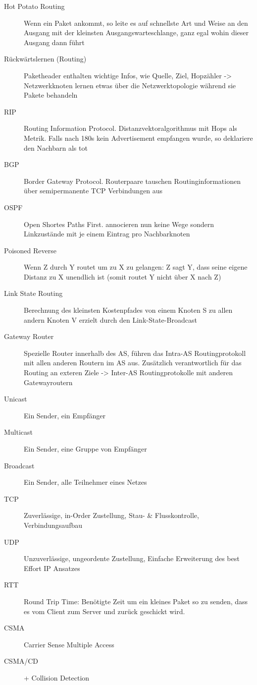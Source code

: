 \documentclass[10pt,landscape]{article}
\begin{document}
\begin{multicols}{3}
\begin{description}
    \item[Hot Potato Routing] Wenn ein Paket ankommt, so leite es auf schnellste Art und Weise an den Ausgang mit der kleinsten Ausgangswarteschlange, ganz egal wohin dieser Ausgang dann führt
    \item[Rückwärtslernen (Routing)] Paketheader enthalten wichtige Infos, wie Quelle, Ziel, Hopzähler -> Netzwerkknoten lernen etwas über die Netzwerktopologie während sie Pakete behandeln
    \item[RIP] Routing Information Protocol. Distanzvektoralgorithmus mit Hops als Metrik. Falls nach 180s kein Advertisement empfangen wurde, so deklariere den Nachbarn als tot
    \item[BGP] Border Gateway Protocol. Routerpaare tauschen Routinginformationen über semipermanente TCP Verbindungen aus
    \item[OSPF] Open Shortes Paths First. annocieren nun keine Wege sondern Linkzustände mit je einem Eintrag pro Nachbarknoten 
    \item[Poisoned Reverse] Wenn Z durch Y routet um zu X zu gelangen: Z sagt Y, dass seine eigene Distanz zu X unendlich ist (somit routet Y nicht über X nach Z) 
    \item[Link State Routing] Berechnung des kleinsten Kostenpfades von einem Knoten S zu allen andern Knoten V erzielt durch den Link-State-Broadcast
    \item[Gateway Router] Spezielle Router innerhalb des AS, führen das Intra-AS Routingprotokoll mit allen anderen Routern im AS aus. Zusätzlich verantwortlich für das Routing an exteren Ziele -> Inter-AS Routingprotokolle mit anderen Gatewayroutern 
    \item[Unicast] Ein Sender, ein Empfänger
    \item[Multicast] Ein Sender, eine Gruppe von Empfänger
    \item[Broadcast] Ein Sender, alle Teilnehmer eines Netzes
    \item[TCP] Zuverlässige, in-Order Zustellung, Stau- \& Flusskontrolle, Verbindungsaufbau
    \item[UDP] Unzuverlässige, ungeordente Zustellung, Einfache Erweiterung des best Effort IP Ansatzes
    \item[RTT] Round Trip Time: Benötigte Zeit um ein kleines Paket so zu senden, dass es vom Client zum Server und zurück geschickt wird.
    \item[CSMA] Carrier Sense Multiple Access 
    \item[CSMA/CD] + Collision Detection

\end{description}
\end{multicols}
\end{document}
